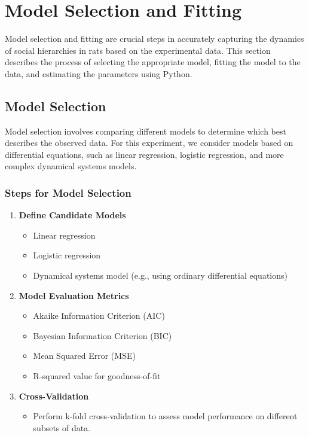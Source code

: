 \documentclass[english, a4paper, 11pt]{article}
\begin{document}
\section*{Model Selection and Fitting}

Model selection and fitting are crucial steps in accurately capturing the dynamics of social hierarchies in rats based on the experimental data. This section describes the process of selecting the appropriate model, fitting the model to the data, and estimating the parameters using Python.

\subsection*{Model Selection}

Model selection involves comparing different models to determine which best describes the observed data. For this experiment, we consider models based on differential equations, such as linear regression, logistic regression, and more complex dynamical systems models.

\subsubsection*{Steps for Model Selection}

\begin{enumerate}
    \item \textbf{Define Candidate Models}
          \begin{itemize}
              \item Linear regression
              \item Logistic regression
              \item Dynamical systems model (e.g., using ordinary differential equations)
          \end{itemize}
    \item \textbf{Model Evaluation Metrics}
          \begin{itemize}
              \item Akaike Information Criterion (AIC)
              \item Bayesian Information Criterion (BIC)
              \item Mean Squared Error (MSE)
              \item R-squared value for goodness-of-fit
          \end{itemize}
    \item \textbf{Cross-Validation}
          \begin{itemize}
              \item Perform k-fold cross-validation to assess model performance on different subsets of data.
          \end{itemize}
\end{enumerate}
\end{document}
